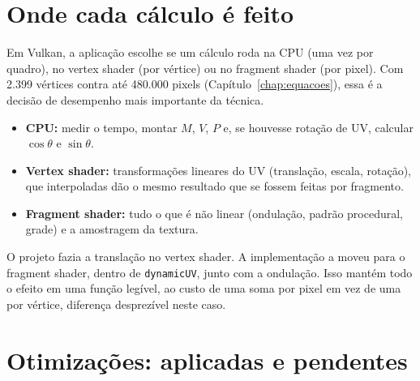 \section{Onde cada cálculo é feito}
\label{sec:onde-calculo}

Em Vulkan, a aplicação escolhe se um cálculo roda na CPU (uma vez por quadro), no vertex shader (por vértice) ou no fragment shader (por pixel). Com 2.399 vértices contra até 480.000 pixels (Capítulo~\ref{chap:equacoes}), essa é a decisão de desempenho mais importante da técnica.
\begin{itemize}
    \item \textbf{CPU:} medir o tempo, montar \(M\), \(V\), \(P\) e, se houvesse rotação de UV, calcular \(\cos\theta\) e \(\sin\theta\).
    \item \textbf{Vertex shader:} transformações lineares do UV (translação, escala, rotação), que interpoladas dão o mesmo resultado que se fossem feitas por fragmento.
    \item \textbf{Fragment shader:} tudo o que é não linear (ondulação, padrão procedural, grade) e a amostragem da textura.
\end{itemize}
O projeto fazia a translação no vertex shader. A implementação a moveu para o fragment shader, dentro de \texttt{dynamicUV}, junto com a ondulação. Isso mantém todo o efeito em uma função legível, ao custo de uma soma por pixel em vez de uma por vértice, diferença desprezível neste caso.

\section{Otimizações: aplicadas e pendentes}


